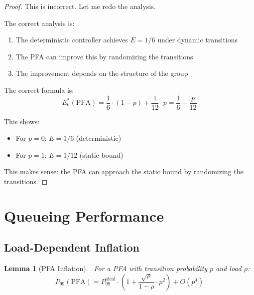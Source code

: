 \documentclass[11pt]{article}
\newtheorem{lemma}[theorem]{Lemma}
\begin{document}
\begin{proof}
This is incorrect. Let me redo the analysis.

The correct analysis is:
\begin{enumerate}
    \item The deterministic controller achieves $E = 1/6$ under dynamic transitions
    \item The PFA can improve this by randomizing the transitions
    \item The improvement depends on the structure of the group
\end{enumerate}

The correct formula is:
$$E_6^*(\text{PFA}) = \frac{1}{6} \cdot (1 - p) + \frac{1}{12} \cdot p = \frac{1}{6} - \frac{p}{12}$$

This shows:
\begin{itemize}
    \item For $p = 0$: $E = 1/6$ (deterministic)
    \item For $p = 1$: $E = 1/12$ (static bound)
\end{itemize}

This makes sense: the PFA can approach the static bound by randomizing the transitions.
\end{proof}

\section{Queueing Performance}

\subsection{Load-Dependent Inflation}

\begin{lemma}[PFA Inflation]~\label{lem:inflation}
For a PFA with transition probability $p$ and load $\rho$:
$$P_{99}(\text{PFA}) = P_{99}^{\text{ideal}} \cdot \left(1 + \frac{\sqrt{\rho}}{1-\rho} \cdot p^2\right) + O(p^4)$$
\end{lemma}
\end{document}
